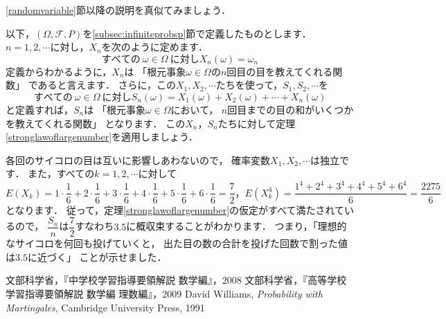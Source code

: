 \documentclass[./main]{subfiles} %
\theoremstyle{definition}
\begin{document}
\ref{randomvariable}節以降の説明を真似てみましょう．

以下，$(\Omega,\mathcal{F},P)$を\ref{subsec:infiniteprobsp}節で定義したものとします．
$n=1,2,\cdots$に対し，$X_n$を次のように定めます．
\[ すべての\ \omega\in\Omega\ に対しX_n(\omega)=\omega_n \]
定義からわかるように，$X_n$は
「根元事象$\omega\in\Omega$の$n$回目の目を教えてくれる関数」
であると言えます．
さらに，この$X_1,X_2,\cdots$たちを使って，$S_1,S_2,\cdots$を
\[ すべての\ \omega\in\Omega\ に対し
S_n(\omega)=X_1(\omega)+X_2(\omega)+\cdots+X_n(\omega) \]
と定義すれば，$S_n$は
「根元事象$\omega\in\Omega$において，
$n$回目までの目の和がいくつかを教えてくれる関数」
となります．
この$X_n$，$S_n$たちに対して定理\ref{stronglawoflargenumber}を適用しましょう．

各回のサイコロの目は互いに影響しあわないので，
確率変数$X_1,X_2,\cdots$は独立です．
また，すべての$k=1,2,\cdots$に対して
\[ E(X_k)=1\cdot\frac{1}{6}+2\cdot\frac{1}{6}
+3\cdot\frac{1}{6}+4\cdot\frac{1}{6}+5\cdot\frac{1}{6}
+6\cdot\frac{1}{6}=\frac{7}{2}，
E(X_k^4)=\frac{1^4+2^4+3^4+4^4+5^4+6^4}{6}=\frac{2275}{6} \]
となります．
従って，定理\ref{stronglawoflargenumber}の仮定がすべて満たされているので，
$\dfrac{S_n}{n}$は$\dfrac{7}{2}$すなわち$3.5$に概収束することがわかります．
つまり，「理想的なサイコロを何回も投げていくと，
出た目の数の合計を投げた回数で割った値は$3.5$に近づく」
ことが示せました．

\begin{thebibliography}{3}
文部科学省，『中学校学習指導要領解説 数学編』，2008
文部科学省，『高等学校学習指導要領解説 数学編 理数編』，2009
David Williams, \textit{Probability with Martingales}, Cambridge University Press, 1991
\end{thebibliography}

\end{document}
